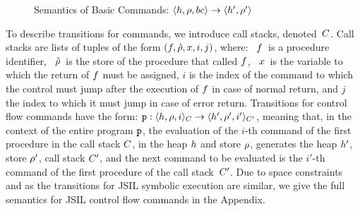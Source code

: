 \begin{figure}[ht!]
{}
\vspace*{-0.5cm}
\caption{Semantics of \jsil Basic Commands: {$\semtrans{\heap, \store, \bcmd}{\heap', \store'}$}\label{fig:sem:basic:commands}}
\end{figure}

To describe transitions for \jsil commands, we introduce call stacks, denoted~$C$. Call stacks are lists of tuples of the form $(f, \hat\rho, x, i, j)$, where: 
~$f$~is a procedure identifier, 
~$\hat\rho$~is the store of the procedure that called $f$, ~$x$~is 
the variable to which the return of $f$ must be assigned,  $i$ is the index 
of the command to which the control must jump after the execution of $f$ in 
case of normal return, and  $j$ the index to which it must jump in case of 
error return. Transitions for control flow commands have the form:  $\semtrans[\prog]{\heap, \store, i}{\heap', \store', i'}[\ctx][\ctx']$, meaning that, in the context of the entire program $\mathtt{p}$, the evaluation of the $i$-th command of the first procedure in the call stack $C$, in
the heap $h$ and store $\rho$, generates the heap $h'$, store $\rho'$, call stack $C'$,   
and the next command to be evaluated is the $i'$-th command of the first procedure of the call stack~$C'$. Due to space constraints and as the transitions for JSIL symbolic execution are  similar, we give the full semantics for JSIL control flow commands in the Appendix.

